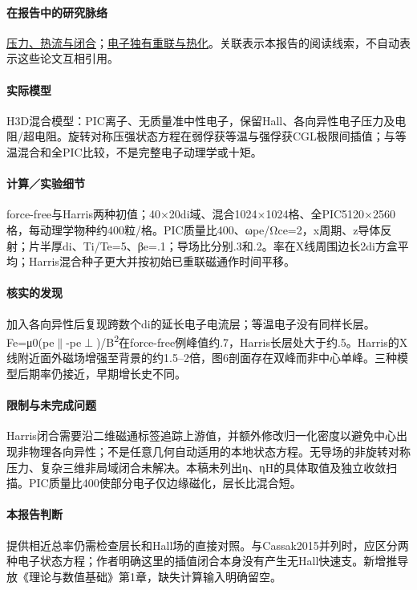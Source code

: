 \documentclass[UTF8,a4paper,11pt,openany,fontset=fandol]{ctexbook}
\begin{document}
\paragraph{在报告中的研究脉络}\hyperref[story:closure]{压力、热流与闭合}；\hyperref[story:energy]{电子独有重联与热化}。关联表示本报告的阅读线索，不自动表示这些论文互相引用。

\paragraph{实际模型}H3D混合模型：PIC离子、无质量准中性电子，保留Hall、各向异性电子压力及电阻/超电阻。旋转对称压强状态方程在弱俘获等温与强俘获CGL极限间插值；与等温混合和全PIC比较，不是完整电子动理学或十矩。

\paragraph{计算／实验细节}force-free与Harris两种初值；40×20di域、混合1024×1024格、全PIC5120×2560格，每动理学物种约400粒/格。PIC质量比400、ωpe/Ωce=2，x周期、z导体反射；片半厚di、Ti/Te=5、βe=.1；导场比分别.3和.2。率在X线周围边长2di方盒平均；Harris混合种子更大并按初始已重联磁通作时间平移。

\paragraph{核实的发现}加入各向异性后复现跨数个di的延长电子电流层；等温电子没有同样长层。Fe=μ0(pe\ensuremath{\parallel}-pe\ensuremath{\perp})/B\textsuperscript{2}在force-free例峰值约.7，Harris长层处大于约.5。Harris的X线附近面外磁场增强至背景的约1.5–2倍，图6剖面存在双峰而非中心单峰。三种模型后期率仍接近，早期增长史不同。

\paragraph{限制与未完成问题}Harris闭合需要沿二维磁通标签追踪上游值，并额外修改归一化密度以避免中心出现非物理各向异性；不是任意几何自动适用的本地状态方程。无导场的非旋转对称压力、复杂三维非局域闭合未解决。本稿未列出η、ηH的具体取值及独立收敛扫描。PIC质量比400使部分电子仅边缘磁化，层长比混合短。

\paragraph{本报告判断}提供相近总率仍需检查层长和Hall场的直接对照。与Cassak2015并列时，应区分两种电子状态方程；作者明确这里的插值闭合本身没有产生无Hall快速支。新增推导放《理论与数值基础》第1章，缺失计算输入明确留空。
\end{document}
